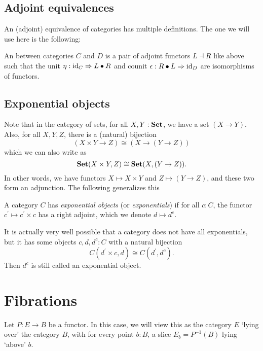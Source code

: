 \subsection{Adjoint equivalences}
An (adjoint) equivalence of categories has multiple definitions. The one we will use here is the following:

\begin{definition}\label{def:equivalence-of-categories}
  An  between categories $ C $ and $ D $ is a pair of adjoint functors $ L \dashv R $ like above such that the unit $ \eta: \text{id}_{C} \Rightarrow L \bullet R $ and counit $ \epsilon: R \bullet L \Rightarrow \text{id}_{D} $ are isomorphisms of functors.
\end{definition}

\subsection{Exponential objects}
Note that in the category of sets, for all $ X, Y: \mathbf{Set} $, we have a set $ (X \to Y) $. Also, for all $ X, Y, Z $, there is a (natural) bijection
\[ (X \times Y \to Z) \cong (X \to (Y \to Z)) \]
which we can also write as
\[ \mathbf{Set}(X \times Y, Z) \cong \mathbf{Set}(X, (Y \to Z)). \]
In other words, we have functors $ X \mapsto X \times Y $ and $ Z \mapsto (Y \to Z) $, and these two form an adjunction. The following generalizes this
\begin{definition}
  A category $ C $ has \textit{exponential objects} (or \textit{exponentials}) if for all $ c: C $, the functor $ c^\prime \mapsto c^\prime \times c $ has a right adjoint, which we denote $ d \mapsto d^c $.
\end{definition}

\begin{remark}
  It is actually very well possible that a category does not have all exponentials, but it has some objects $ c, d, d^c: C $ with a natural bijection
  \[ C(d^\prime \times c, d) \cong C(d^\prime, d^c). \]
  Then $ d^c $ is still called an exponential object.
\end{remark}

\section{Fibrations}
Let $ P : E \to B $ be a functor. In this case, we will view this as the category $ E $ `lying over' the category $ B $, with for every point $ b: B $, a slice $ E_b = P^{-1}(B) $ lying `above' $ b $.


